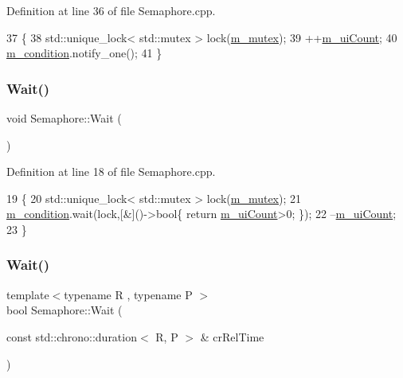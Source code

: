 Definition at line 36 of file Semaphore.\+cpp.


\begin{DoxyCode}
37 \{
38       std::unique\_lock< std::mutex > lock(\hyperlink{classSemaphore_a6490f302f311da3ce373a81672673296}{m\_mutex});
39       ++\hyperlink{classSemaphore_a1456f105008b0c309f41211afbdd5fee}{m\_uiCount};
40       \hyperlink{classSemaphore_a2b04d3a53f1fc1a13d7ed5d19d9e2be9}{m\_condition}.notify\_one();
41 \}
\end{DoxyCode}
\mbox{\label{classSemaphore_a72aabebf026e3a8b1f3e4d0fa8ee1eda}} 
\subsubsection{\texorpdfstring{Wait()}{Wait()}\hspace{0.1cm}{\footnotesize\ttfamily [1/2]}}
{\footnotesize\ttfamily void Semaphore\+::\+Wait (\begin{DoxyParamCaption}{ }\end{DoxyParamCaption})}



Definition at line 18 of file Semaphore.\+cpp.


\begin{DoxyCode}
19 \{
20       std::unique\_lock< std::mutex > lock(\hyperlink{classSemaphore_a6490f302f311da3ce373a81672673296}{m\_mutex});
21       \hyperlink{classSemaphore_a2b04d3a53f1fc1a13d7ed5d19d9e2be9}{m\_condition}.wait(lock,[&]()->\textcolor{keywordtype}{bool}\{ \textcolor{keywordflow}{return} \hyperlink{classSemaphore_a1456f105008b0c309f41211afbdd5fee}{m\_uiCount}>0; \});
22       --\hyperlink{classSemaphore_a1456f105008b0c309f41211afbdd5fee}{m\_uiCount};
23 \}
\end{DoxyCode}
\mbox{\label{classSemaphore_a7f700173ae86ae623684109066e07656}} 
\subsubsection{\texorpdfstring{Wait()}{Wait()}\hspace{0.1cm}{\footnotesize\ttfamily [2/2]}}
{\footnotesize\ttfamily template$<$typename R , typename P $>$ \\
bool Semaphore\+::\+Wait (\begin{DoxyParamCaption}\item[{const std\+::chrono\+::duration$<$ R, P $>$ \&}]{cr\+Rel\+Time }\end{DoxyParamCaption})}



